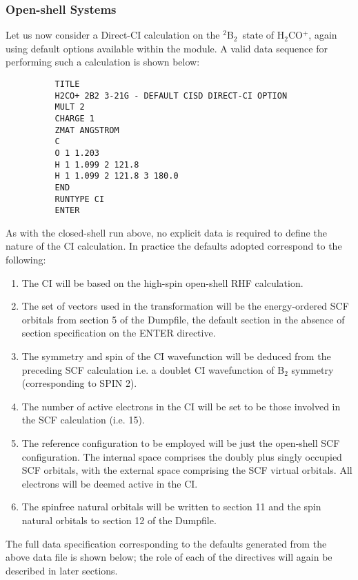 \documentclass[11pt,fleqn]{article}
\newcommand{\formion}{\mbox{H$_{2}$CO$^{+}$}}
\newcommand{\bstate}{\mbox{$^{2}$B$_{2}$}}
\begin{document}
\subsubsection{Open-shell Systems}

Let us now consider a Direct-CI calculation  on the \bstate\  state of
\formion, again using default options available within the module. A
valid data sequence for performing such a calculation is shown below:

{
\footnotesize
\begin{verbatim}
          TITLE
          H2CO+ 2B2 3-21G - DEFAULT CISD DIRECT-CI OPTION
          MULT 2
          CHARGE 1
          ZMAT ANGSTROM
          C
          O 1 1.203
          H 1 1.099 2 121.8
          H 1 1.099 2 121.8 3 180.0
          END
          RUNTYPE CI
          ENTER
\end{verbatim}
}
As with the closed-shell run above, no explicit data is required to
define the nature of the CI calculation. In practice the defaults
adopted correspond to the following:
\begin{enumerate}
\item The CI will be based on the high-spin open-shell RHF calculation.
\item The set of vectors used in the transformation will be
the energy-ordered SCF orbitals from section 5 of the Dumpfile, the
default section in the absence of section specification on the ENTER
directive.
\item The symmetry and spin of the CI wavefunction will be deduced
from the preceding SCF calculation i.e. a doublet CI wavefunction of B$_{2}$
symmetry (corresponding to SPIN 2).
\item The number of active electrons in the CI will be set to be those
involved in the SCF calculation (i.e. 15).
\item The reference configuration to be employed will be just the
open-shell SCF configuration. The internal space comprises the doubly plus
singly occupied SCF orbitals, with the external space comprising the SCF
virtual orbitals. All electrons will be deemed active in the CI.
\item The spinfree natural orbitals will be written to section
11 and the spin natural orbitals to section 12 of the Dumpfile.
\end{enumerate}

The full data specification corresponding to the defaults generated
from the above data file is shown below; the role of each of the
directives will again be described in later sections.
\end{document}
